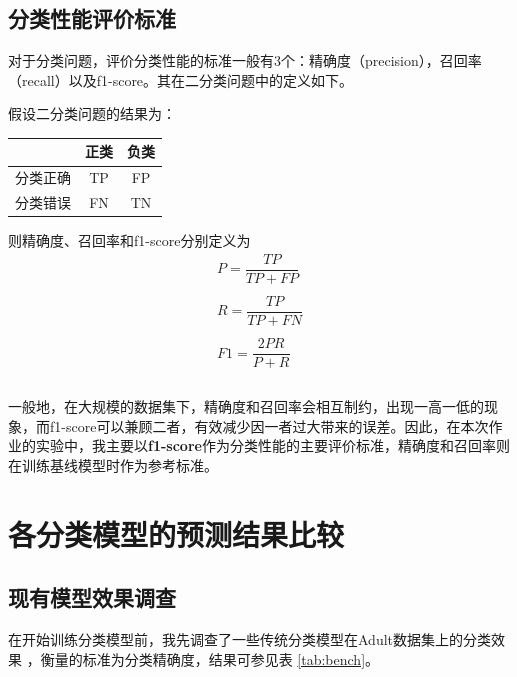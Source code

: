 \documentclass[12pt,a4paper]{article}
\theoremstyle{definition}
\begin{document}
\subsection{分类性能评价标准}

对于分类问题，评价分类性能的标准一般有3个：精确度（precision），召回率（recall）以及f1-score。其在二分类问题中的定义如下。

假设二分类问题的结果为：


\begin{table}[H]
	\centering
	\begin{tabular}{c|c|c}
		& 正类 &  负类 \\
		\hline
		\hline
	
		 分类正确 & TP & FP \\
		 分类错误 & FN & TN \\
	\end{tabular}
\end{table}

则精确度、召回率和f1-score分别定义为
\begin{equation}
	\begin{aligned}
	P = \dfrac{TP}{TP + FP} \\ \\
	R = \dfrac{TP}{TP + FN} \\ \\
	F1 = \dfrac{2PR}{P + R} \\ \\
	\end{aligned}
\end{equation}

\vspace{-0.03\linewidth}
一般地，在大规模的数据集下，精确度和召回率会相互制约，出现一高一低的现象，而f1-score可以兼顾二者，有效减少因一者过大带来的误差。因此，在本次作业的实验中，我主要以\textbf{f1-score}作为分类性能的主要评价标准，精确度和召回率则在训练基线模型时作为参考标准。

\section{各分类模型的预测结果比较}
\label{sec:model-single}

\subsection{现有模型效果调查}

在开始训练分类模型前，我先调查了一些传统分类模型在Adult数据集上的分类效果 \cite{bench}，衡量的标准为分类精确度，结果可参见表 \ref{tab:bench}。
\end{document}
